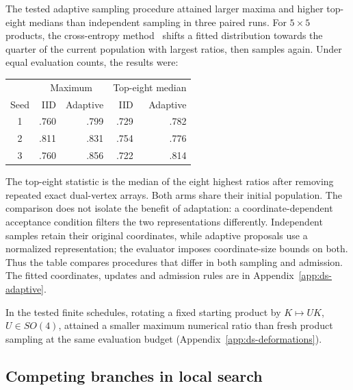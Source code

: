 The tested adaptive sampling procedure attained larger maxima and
higher top-eight medians than independent sampling in three paired runs.
For $5\times5$ products, the cross-entropy method~\cite{dsDeBoer2005}
shifts a fitted distribution towards the quarter of the current population
with largest ratios, then samples again. Under equal evaluation counts,
the results were:
\begin{center}
\begin{tabular}{crrrr}
\hline
 & \multicolumn{2}{c}{Maximum} & \multicolumn{2}{c}{Top-eight median}\\
Seed & IID & Adaptive & IID & Adaptive\\
\hline
1 & .760 & .799 & .729 & .782\\
2 & .811 & .831 & .754 & .776\\
3 & .760 & .856 & .722 & .814\\
\hline
\end{tabular}
\end{center}
The top-eight statistic is the median of the eight highest ratios after
removing repeated exact dual-vertex arrays. Both arms share their initial
population. The comparison does not isolate the benefit of adaptation:
a coordinate-dependent acceptance condition filters the two
representations differently. Independent samples retain their original
coordinates, while adaptive proposals use a normalized representation;
the evaluator imposes coordinate-size bounds on both. Thus the table
compares procedures that differ in both sampling and admission. The
fitted coordinates, updates and admission rules are in
Appendix~\ref{app:ds-adaptive}.

In the tested finite schedules, rotating a fixed starting product by
$K\mapsto UK$, $U\in SO(4)$, attained a smaller maximum numerical ratio
than fresh product sampling at the same evaluation budget
(Appendix~\ref{app:ds-deformations}).

\subsection{Competing branches in local search}
\label{subsec:black-box-datascience-finite-budget-optimization}

